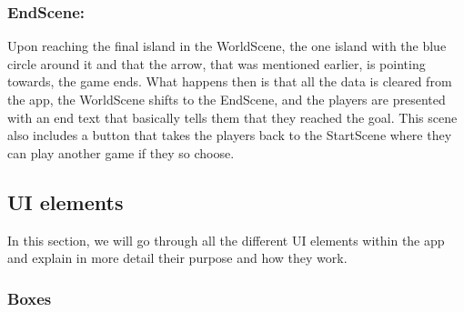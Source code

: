 \subsubsection{EndScene:}

Upon reaching the final island in the WorldScene, the one island with the blue circle around it and that the arrow, that was mentioned earlier, is pointing towards, the game ends. What happens then is that all the data is cleared from the app, the WorldScene shifts to the EndScene, and the players are presented with an end text that basically tells them that they reached the goal. This scene also includes a button that takes the players back to the StartScene where they can play another game if they so choose.



\subsection{UI elements}

In this section, we will go through all the different UI elements within the app and explain in more detail their purpose and how they work.

\subsubsection{Boxes}

